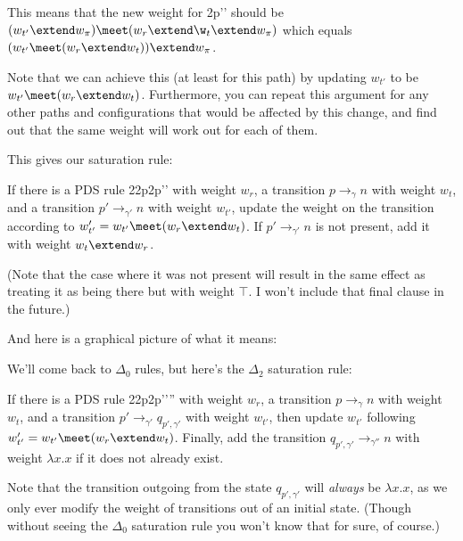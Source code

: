 \documentclass{article}
\newcommand{\config}{2}{\ensuremath{\langle #1, #2 \rangle}}
\newcommand{\rule}{2}{\ensuremath{#1 \righthookarrow #2}}
\newcommand{\trans}[3]{\ensuremath{#1 \rightarrow_{#2} #3}}
\begin{document}
\begin{defintion}

This means that the new weight for \config{p'}{\gamma' \pi} should be
$(w_{t'} \extend w_\pi) \meet (w_r \extend \w_t \extend w_\pi)$ which
equals $(w_{t'} \meet (w_r \extend w_t)) \extend w_\pi$.

Note that we can achieve this (at least for this path) by updating
$w_{t'}$ to be $w_{t'} \meet (w_r \extend w_t)$. Furthermore, you can
repeat this argument for any other paths and configurations that would
be affected by this change, and find out that the same weight will
work out for each of them.

This gives our saturation rule:

   If there is a PDS rule
   \rule{\config{p}{\gamma}}{\config{p'}{\gamma'}} with weight $w_r$,
   a transition \trans{p}{\gamma}{n} with weight $w_t$, and a
   transition \trans{p'}{\gamma'}{n} with weight $w_{t'}$, update the
   weight on the transition according to $w_{t'}' = w_{t'} \meet (w_r
   \extend w_t)$. If \trans{p'}{\gamma'}{n} is not present, add it
   with weight $w_t \extend w_r$.

(Note that the case where it was not present will result in the same
   effect as treating it as being there but with weight $\top$. I
   won't include that final clause in the future.)

And here is a graphical picture of what it means:


We'll come back to $\Delta_0$ rules, but here's the $\Delta_2$
saturation rule:

   If there is a PDS rule
   \rule{\config{p}{\gamma}}{\config{p'}{\gamma'\gamma''}} with weight
   $w_r$, a transition \trans{p}{\gamma}{n} with weight $w_t$, and a
   transition \trans{p'}{\gamma'}{q_{p',\gamma'}} with weight
   $w_{t'}$, then update $w_{t'}$ following $w_{t'}' = w_{t'} \meet
   (w_r \extend w_t)$. Finally, add the transition
   \trans{q_{p',\gamma'}}{\gamma''}{n} with weight $\lambda x.x$ if it
   does not already exist.

Note that the transition outgoing from the state $q_{p',\gamma'}$ will
\emph{always} be $\lambda x. x$, as we only ever modify the weight of
transitions out of an initial state. (Though without seeing the
$\Delta_0$ saturation rule you won't know that for sure, of course.)


\end{defintion}
\end{document}
